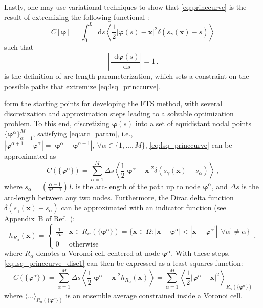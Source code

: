 \documentclass{article}
\numberwithin{equation}{section}
\def\*#1{\mathbf{#1}}
\newcommand*\diff{\mathop{}\!\mathrm{d}}
\theoremstyle{definition}
\theoremstyle{remark}
\def\varphib{\boldsymbol{\varphi}}
\begin{document}
Lastly, one may use variational techniques to show that \cref{eq:princcurve} is the result of extremizing the following functional \citep{hastie1989principal,vanden2009revisiting}:
\begin{equation}
C[\varphib] =  \int_0^L \diff s \left\langle  \frac{1}{2} |\varphib(s)-\* x|^2 \delta(s_\gamma(\* x)-s) \right\rangle \label{eq:lsq_princcurve}
\end{equation}
such that 
\begin{equation}
\left|\frac{\diff \varphib(s)}{\diff s} \right|=1  \,. \label{eq:arc_param}
\end{equation}
 is the definition of arc-length parameterization, which sets a constraint on the possible paths that extremize \cref{eq:lsq_princcurve}. 

 form the starting points for developing the FTS method, with several discretization and approximation steps leading to a solvable optimization problem. 
To this end, discretizing $\varphib(s)$ into a set of equidistant nodal points $\{ \varphib^\alpha \}_{\alpha=1}^{M}$, satisfying \cref{eq:arc_param}, i.e., $|\varphib^{\alpha+1}-\varphib^{\alpha}|=|\varphib^{\alpha}-\varphib^{\alpha-1}|, \ \forall \alpha \in \{1,\ldots,M\}$, 
\cref{eq:lsq_princcurve} can be approximated as
\begin{equation}
C(\{\varphib^\alpha\}) =  \sum_{\alpha=1}^M \Delta s \left\langle  \frac{1}{2} |\varphib^\alpha-\* x|^2 \delta(s_\gamma(\* x)-s_\alpha) \right\rangle 
\label{eq:lsq_princcurve_disc1} \,,
\end{equation}
where $s_\alpha = \left(\frac{\alpha-1}{M-1}\right)L$ is the arc-length of the path up to node $\varphib^\alpha$, and $\Delta s$ is the arc-length between any two nodes. 
Furthermore, the Dirac delta function $\delta(s_{\gamma}(\* x)-s_\alpha)$ can be approximated with an indicator function (see Appendix~B of Ref.~\cite{vanden2009revisiting}):
\begin{equation}
h_{R_{\alpha}}(\* x) = \begin{cases}
\frac{1}{\Delta s} &  \* x \in R_\alpha(\{ \varphib^\alpha \}) = \{\* x \in \Omega : |\* x-\varphib^\alpha| < | \* x-\varphib^{\alpha^\prime}| \ \ \forall \alpha^\prime \neq \alpha \}
\\
0 & \text{otherwise} 
\end{cases}
\,, 
\label{eq:indicatorfunc}
\end{equation}
where $R_\alpha$ denotes a Voronoi cell centered at node $\varphib^\alpha$. With these steps,
\cref{eq:lsq_princcurve_disc1} can then be expressed as a least-squares function: 
\begin{equation}
C(\{\varphib^\alpha\}) =  \sum_{\alpha=1}^M \Delta s \left\langle \frac{1}{2} |\varphib^\alpha-\* x|^2 h_{R_\alpha}(\* x) \right\rangle = \sum_{\alpha=1}^M \left\langle \frac{1}{2} |\varphib^\alpha-\* x|^2 \right\rangle_{R_\alpha(\{ \varphib^\alpha \})} \label{eq:empriskfunc_fts} 
\end{equation}
where $\langle \ldots \rangle_{R_\alpha(\{\varphib^\alpha\})}$ is an ensemble average constrained inside a Voronoi cell. 
\end{document}
